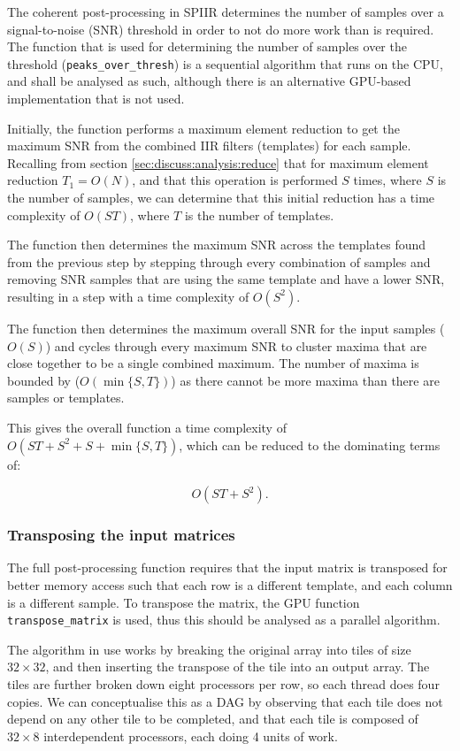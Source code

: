 \documentclass{article}
\begin{document}
The coherent post-processing in SPIIR determines the number of samples over a signal-to-noise (SNR) threshold in order to not do more work than is required.
The function that is used for determining the number of samples over the threshold (\texttt{peaks\_over\_thresh}) is a sequential algorithm that runs on the CPU, and shall be analysed as such, although there is an alternative GPU-based implementation that is not used.

Initially, the function performs a maximum element reduction to get the maximum SNR from the combined IIR filters (templates) for each sample.
Recalling from section \ref{sec:discuss:analysis:reduce} that for maximum element reduction \(T_1 = O(N)\), and that this operation is performed \(S\) times, where \(S\) is the number of samples, we can determine that this initial reduction has a time complexity of \(O(ST)\), where \(T\) is the number of templates.

The function then determines the maximum SNR across the templates found from the previous step by stepping through every combination of samples and removing SNR samples that are using the same template and have a lower SNR, resulting in a step with a time complexity of \(O(S^2)\).

The function then determines the maximum overall SNR for the input samples (\(O(S)\)) and cycles through every maximum SNR to cluster maxima that are close together to be a single combined maximum.
The number of maxima is bounded by (\(O(\min\{S,T\})\)) as there cannot be more maxima than there are samples or templates.

This gives the overall function a time complexity of \(O(ST + S^2 + S + \min\{S,T\})\), which can be reduced to the dominating terms of:

\[
    O(ST + S^2).
\]

\subsubsection{Transposing the input matrices} \label{sec:discuss:analysis:transpose}

The full post-processing function requires that the input matrix is transposed for better memory access such that each row is a different template, and each column is a different sample.
To transpose the matrix, the GPU function \texttt{transpose\_matrix} is used, thus this should be analysed as a parallel algorithm.

The algorithm in use works by breaking the original array into tiles of size \(32\times32\), and then inserting the transpose of the tile into an output array.
The tiles are further broken down eight processors per row, so each thread does four copies.
We can conceptualise this as a DAG by observing that each tile does not depend on any other tile to be completed, and that each tile is composed of \(32\times8\) interdependent processors, each doing 4 units of work.
\end{document}
